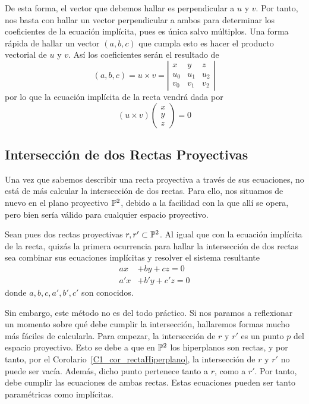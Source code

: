 De esta forma, el vector que debemos hallar es perpendicular a $u$ y $v$. Por tanto, nos basta con hallar un vector perpendicular a ambos para determinar los coeficientes de la ecuación implícita, pues es única salvo múltiplos. Una forma rápida de hallar un vector $(a,b,c)$ que cumpla esto es hacer el producto vectorial de $u$ y $v$. Así los coeficientes serán el resultado de 
\begin{equation}
	\label{C3_eq_implicita_cross_coef}
	(a,b,c)=u\times v=\left| \begin{array}{ccc}
		x & y & z\\
		u_0 & u_1 & u_2\\
		v_0 & v_1 & v_2
	\end{array}\right| 
\end{equation}
por lo que la ecuación implícita de la recta vendrá dada por 
\begin{equation}
\label{C3_eq_implicita_cross}
	(u\times v)\left( \begin{array}{c}
	x\\
	y\\
	z
	\end{array}\right) =0
\end{equation}
\subsection{Intersección de dos Rectas Proyectivas}
Una vez que sabemos describir una recta proyectiva a través de sus ecuaciones, no está de más calcular la intersección de dos rectas. Para ello, nos situamos de nuevo en el plano proyectivo $\mathbb{P}^2$, debido a la facilidad con la que allí se opera, pero bien sería válido para cualquier espacio proyectivo.

Sean pues dos rectas proyectivas $r,r'\subset\mathbb{P}^2$. Al igual que con la ecuación implícita de la recta, quizás la primera ocurrencia para hallar la intersección de dos rectas sea combinar sus ecuaciones implícitas y resolver el sistema resultante
\begin{equation*}
	\begin{split}
		ax&+by+cz=0\\
		a'x&+b'y+c'z=0
	\end{split}
\end{equation*}
donde $a,b,c,a',b',c'$ son conocidos.

Sin embargo, este método no es del todo práctico. Si nos paramos a reflexionar un momento sobre qué debe cumplir la intersección, hallaremos formas mucho más fáciles de calcularla. Para empezar, la intersección de $r$ y $r'$ es un punto $p$ del espacio proyectivo. Esto se debe a que en $\mathbb{P}^2$ los hiperplanos son rectas, y por tanto, por el Corolario~\ref{C1_cor_rectaHiperplano}, la intersección de $r$ y $r'$ no puede ser vacía. Además, dicho punto pertenece tanto a $r$, como a $r'$. Por tanto, debe cumplir las ecuaciones de ambas rectas. Estas ecuaciones pueden ser tanto paramétricas como implícitas.

